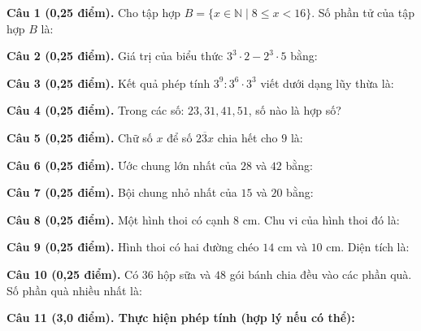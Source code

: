 \documentclass[12pt,a4paper]{article}
\begin{document}
\noindent\textbf{Câu 1 (0,25 điểm).} Cho tập hợp $B = \{x \in \mathbb{N} \mid 8 \le x < 16\}$. Số phần tử của tập hợp $B$ là: \par\vspace{0.25mm}
\noindent\textbf{Câu 2 (0,25 điểm).} Giá trị của biểu thức $3^3 \cdot 2 - 2^3 \cdot 5$ bằng: \par\vspace{0.25mm}
\noindent\textbf{Câu 3 (0,25 điểm).} Kết quả phép tính $3^9 : 3^6 \cdot 3^3$ viết dưới dạng lũy thừa là: \par\vspace{0.25mm}
\noindent\textbf{Câu 4 (0,25 điểm).} Trong các số: $23, 31, 41, 51$, số nào là hợp số? \par\vspace{0.25mm}
\noindent\textbf{Câu 5 (0,25 điểm).} Chữ số $x$ để số $\overline{23x}$ chia hết cho $9$ là: \par\vspace{0.25mm}
\noindent\textbf{Câu 6 (0,25 điểm).} Ước chung lớn nhất của $28$ và $42$ bằng: \par\vspace{0.25mm}
\noindent\textbf{Câu 7 (0,25 điểm).} Bội chung nhỏ nhất của $15$ và $20$ bằng: \par\vspace{0.25mm}
\noindent\textbf{Câu 8 (0,25 điểm).} Một hình thoi có cạnh $8\text{ cm}$. Chu vi của hình thoi đó là: \par\vspace{0.25mm}
\noindent\textbf{Câu 9 (0,25 điểm).} Hình thoi có hai đường chéo $14\text{ cm}$ và $10\text{ cm}$. Diện tích là: \par\vspace{0.25mm}
\noindent\textbf{Câu 10 (0,25 điểm).} Có $36$ hộp sữa và $48$ gói bánh chia đều vào các phần quà. Số phần quà nhiều nhất là: \par\vspace{0.25mm}

\vspace{0.3mm}
\noindent\textbf{Câu 11 (3,0 điểm). Thực hiện phép tính (hợp lý nếu có thể):}
\vspace{0.4mm}
\end{document}
